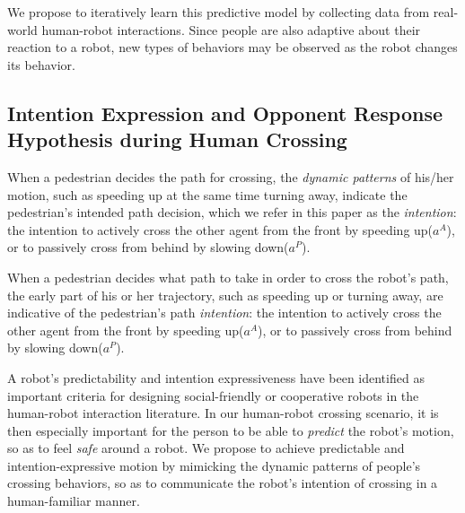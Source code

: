 \documentclass[conference]{IEEEtran}
\begin{document}
We propose to iteratively learn this predictive model by collecting data from real-world human-robot interactions. Since people are also adaptive about their reaction to a robot, 
new types of behaviors may be observed as the robot changes its behavior.

\vspace{-.3em}
\subsection{Intention Expression and Opponent Response Hypothesis during Human Crossing}
When a pedestrian decides the path for crossing, the \textit{dynamic patterns} of his/her
motion, such as speeding up at the same time turning away, indicate the pedestrian's
intended path decision, which we refer in this paper as the \textit{intention}: the 
intention to actively cross the other agent from the front by speeding up($a^A$), 
or to passively cross from behind by slowing down($a^P$).

 When a pedestrian decides what path to take in
order to cross the robot's path, the early part of his or her trajectory, such as speeding up or turning away, are indicative of the pedestrian's path \textit{intention}:  the 
intention to actively cross the other agent from the front by speeding up($a^A$), 
or to passively cross from behind by slowing down($a^P$).



A robot's predictability and intention expressiveness have been identified
as important criteria for designing social-friendly or cooperative robots in 
the human-robot interaction literature. In our human-robot crossing scenario, 
it is then especially important for the person to be able to \textit{predict} 
the robot's motion, so as to feel \textit{safe} around a robot.
We  propose to achieve predictable and 
intention-expressive motion by mimicking the dynamic patterns of people's
crossing behaviors, so as to communicate
the robot's intention of crossing in a human-familiar manner.
\end{document}
